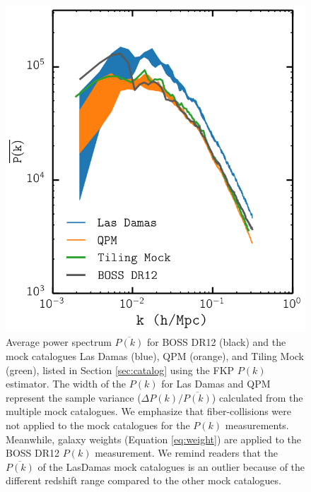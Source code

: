 \documentclass{emulateapj}
\begin{document}
\begin{figure}
\begin{center}
\includegraphics[scale=0.5]{fcpaper_pk_comp.png} 
\caption{Average power spectrum $\overline{P(k)}$ for BOSS DR12 (black) and the mock catalogues Las Damas (blue), QPM (orange), and Tiling Mock (green), listed in Section \ref{sec:catalog} using the FKP $P(k)$ estimator. The width of the $P(k)$ for Las Damas and QPM represent the sample variance ($\Delta P(k)/\overline{P(k)}$) calculated from the multiple mock catalogues. We emphasize that fiber-collisions were not applied to the mock catalogues for the $P(k)$ measurements. Meanwhile, galaxy weights (Equation \ref{eq:weight}) are applied to the BOSS DR12 $P(k)$ measurement. We remind readers that the $\overline{P(k)}$ of the LasDamas mock catalogues is an outlier because of the different redshift range compared to the other mock catalogues.} \label{fig:mockpk}
\end{center}
\end{figure}
\end{document}

